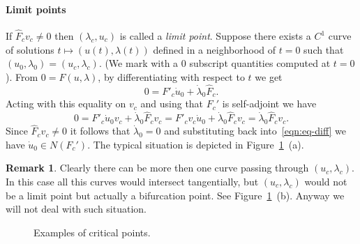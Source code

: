 \documentclass[a4paper,11pt]{article}
\theoremstyle{definition}
\newtheorem{rmk}[prop]{Remark}
\begin{document}
\paragraph{Limit points} If $\hat{F}_cv_c\neq0$ then $(\lambda_c,u_c)$ is called a \emph{limit point}. Suppose there exists a $C^1$ curve of solutions $t\mapsto(u(t),\lambda(t))$ defined in a neighborhood of $t=0$ such that $(u_0,\lambda_0)=(u_c,\lambda_c)$. (We mark with a 0 subscript quantities computed at $t=0$). From $0=F(u,\lambda)$, by differentiating with respect to $t$ we get
\begin{equation}
\label{eqn:eq-diff}
0=F'_c\dot u_0+\dot\lambda_0\hat{F}_c.
\end{equation}
Acting with this equality on $v_c$ and using that $F_c'$ is self-adjoint we have
\[
0=F'_c\dot u_0v_c+\dot\lambda_0\hat{F}_cv_c=F'_cv_c\dot u_0+\dot\lambda_0\hat{F}_cv_c=\dot\lambda_0\hat{F}_cv_c.
\]
Since $\hat{F}_cv_c\neq0$ it follows that $\dot\lambda_0=0$ and substituting back into~\eqref{eqn:eq-diff} we have $\dot u_0\in N(F_c')$. The typical situation is depicted in Figure~\ref{fig:critical-points}~(a).
\begin{rmk}
Clearly there can be more then one curve passing through $(u_c,\lambda_c)$. In this case all this curves would intersect tangentially, but $(u_c,\lambda_c)$ would not be a limit point but actually a bifurcation point. See Figure~\ref{fig:critical-points}~(b). Anyway we will not deal with such situation.
\end{rmk}

\begin{figure}[t]
\centering
\footnotesize

\quad
{}
\quad
{}

\caption{Examples of critical points.}
\label{fig:critical-points}
\end{figure}
\end{document}
